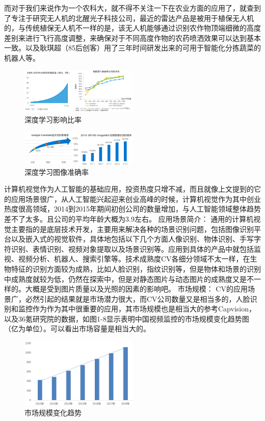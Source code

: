 	
		而对于我们来说作为一个农科大，就不得不关注一下在农业方面的应用了，就查到了专注于研究无人机的北醒光子科技公司，最近的雷达产品是被用于植保无人机的，与传统植保无人机不一样的是，该无人机能够通过识别农作物顶端细微的高度差别来进行飞行高度调整，来确保对于不同高度作物的农药喷洒效果可以达到基本一致。以及耿琪超（85后创客）用了三年时间研发出来的可用于智能化分拣蔬菜的机器人等。
		\begin{figure}[!ht]
			\centering
			\includegraphics[width=0.5\textwidth]{figures/1-6}
			\caption{深度学习影响比率}
		\end{figure}
		\begin{figure}[!ht]
			\centering
			\includegraphics[width=0.5\textwidth]{figures/1-7}
			\caption{深度学习图像准确率}
		\end{figure}
	
	计算机视觉作为人工智能的基础应用，投资热度只增不减，而且就像上文提到的它的应用场景很广，从人工智能兴起迎来创业高峰的时候，计算机视觉作为其中创业热度很高领域，2014到2015年期间初创公司的数量增加，与人工智能领域整体趋势差不了太多。且公司的平均年龄大概为3.9左右。
	应用场景简介：
	通用的计算机视觉主要指的是底层技术开发，主要用来解决各种的场景识别问题，包括图像识别平台以及嵌入式的视觉软件，具体地包括以下几个方面人像识别、物体识别、手写字符识别、表情识别、视频对象提取以及场景识别等。应用到具体的产品中就包括监视、视频分析、机器人、搜索引擎等。技术成熟度CV各细分领域不太一样，在生物特征的识别方面较为成熟，比如人脸识别，指纹识别等，但是物体和场景的识别中成熟度就较为低，仍然在探索中，但是对静态图片与动态图片的成熟度又是不一样的。大概是受到图片质量以及光照的因素的影响吧。
	市场规模：
	CV的应用场景广，必然引起的结果就是市场潜力很大，而CV公司数量又是相当多的，人脸识别和监控作为作为其中很重要的应用，其市场规模也是相当大的参考Capvision，以及36氪研究院的数据，如图1-8显示表明中国视频监控的市场规模变化趋势图（亿为单位）。可以看出市场容量是相当大的。
	\begin{figure}[!ht]
		\centering
		\includegraphics[width=0.5\textwidth]{figures/1-8}
		\caption{市场规模变化趋势}
	\end{figure}
